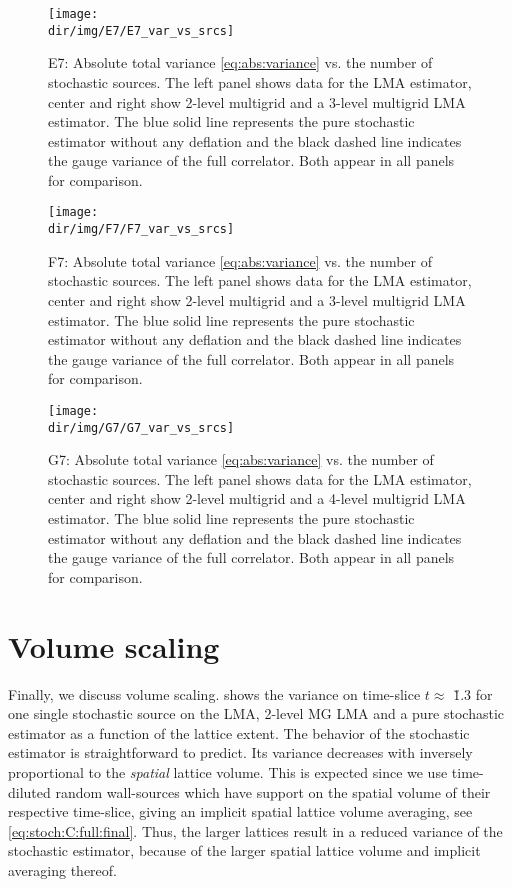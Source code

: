 \begin{figure}
\centering
\texttt{[image: \\dir/img/E7/E7\_var\_vs\_srcs]}
\caption{
E7: Absolute total variance \cref{eq:abs:variance} vs. the number of stochastic sources.
The left panel shows data for the LMA estimator, center and right show 2-level multigrid and a 3-level multigrid LMA estimator.
The blue solid line represents the pure stochastic estimator without any deflation and the black dashed line indicates the gauge variance of the full correlator. Both appear in all panels for comparison.
\takenpart
}
\label{fig:E7:var:vs:sources}
\end{figure}

\begin{figure}
\centering
\texttt{[image: \\dir/img/F7/F7\_var\_vs\_srcs]}
\caption{
F7: Absolute total variance \cref{eq:abs:variance} vs. the number of stochastic sources.
The left panel shows data for the LMA estimator, center and right show 2-level multigrid and a 3-level multigrid LMA estimator.
The blue solid line represents the pure stochastic estimator without any deflation and the black dashed line indicates the gauge variance of the full correlator. Both appear in all panels for comparison.
\takenpart
}
\label{fig:F7:var:vs:sources}
\end{figure}

\begin{figure}
\centering
\texttt{[image: \\dir/img/G7/G7\_var\_vs\_srcs]}
\caption{
G7: Absolute total variance \cref{eq:abs:variance} vs. the number of stochastic sources.
The left panel shows data for the LMA estimator, center and right show 2-level multigrid and a 4-level multigrid LMA estimator.
The blue solid line represents the pure stochastic estimator without any deflation and the black dashed line indicates the gauge variance of the full correlator. Both appear in all panels for comparison.
\takenpart
}
\label{fig:G7:var:vs:sources}
\end{figure}

\section{Volume scaling}
\label{sec:numerics:volume:scaling}

Finally, we discuss volume scaling.
 shows the variance on time-slice $t \approx $ \u{1.3}{\femto \metre} for one single stochastic source on the LMA, 2-level MG LMA and a pure stochastic estimator as a function of the lattice extent.
The behavior of the stochastic estimator is straightforward to predict.
Its variance decreases with inversely proportional to the \textit{spatial} lattice volume.
This is expected since we use time-diluted random wall-sources which have support on the spatial volume of their respective time-slice, giving an implicit spatial lattice volume averaging, see \cref{eq:stoch:C:full:final}.
Thus, the larger lattices result in a reduced variance of the stochastic estimator, because of the larger spatial lattice volume and implicit averaging thereof.

